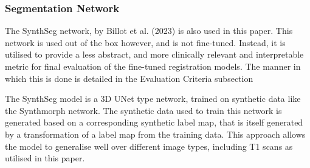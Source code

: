 

\subsubsection{Segmentation Network}
The SynthSeg network, by Billot et al. (2023)\cite{synthseg1}\cite{synthseg2} is also used in this paper. This network is used out of the box however, and is not fine-tuned. Instead, it is utilised to provide a less abstract, and more clinically relevant and interpretable metric for final evaluation of the fine-tuned registration models. The manner in which this is done is detailed in the Evaluation Criteria subsection

The SynthSeg model is a 3D UNet\cite{unet} type network, trained on synthetic data like the Synthmorph network. The synthetic data used to train this network is generated based on a corresponding synthetic label map, that is itself generated by a transformation of a label map from the training data. This approach allows the model to generalise well over different image types, including T1 scans as utilised in this paper.
